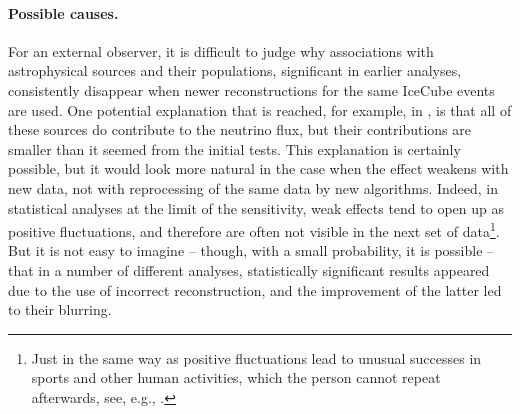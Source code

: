 \documentclass[a4paper,noshowpacs,noshowkeys,floatfix,twocolumn,preprintnumbers,nofootinbib]{revtex4-2}
\begin{document}
\paragraph{Possible causes.}
For an external observer, it is difficult to judge why associations with astrophysical sources and their populations,  significant in earlier analyses, consistently disappear when newer reconstructions for the same IceCube events are used. One potential explanation that is reached, for example, in \cite{Disappearing-corr}, is that all of these sources do contribute to the neutrino flux, but their contributions are smaller than it seemed from the initial tests. This explanation is certainly possible, but it would look more natural in the case when the effect weakens with new data, not with reprocessing of the same data by new algorithms. Indeed, in statistical analyses at the limit of the sensitivity, weak effects tend to open up as positive fluctuations, and therefore are often not visible in the next set of data\footnote{Just in the same way as positive fluctuations lead to unusual successes in sports and other human activities, which the person cannot repeat afterwards, see, e.g., \protect\cite{Kahneman}.}. But it is not easy to imagine -- though, with a small probability, it is possible -- that in a number of different analyses, statistically significant results appeared due to the use of incorrect reconstruction, and the improvement of the latter led to their blurring.
\end{document}
